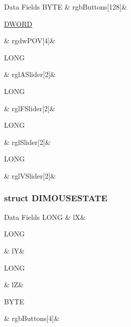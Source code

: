 \begin{DoxyFields}{Data Fields}
\hypertarget{a00003_a67d8ad707a967fceb3d5e7269cde97af}{B\-Y\-T\-E}\label{a00003_a67d8ad707a967fceb3d5e7269cde97af}
&
rgb\-Buttons\mbox{[}128\mbox{]}&
\\
\hline

\hypertarget{a00003_ae49cd858af76a488ea366d4b7b6be542}{\hyperlink{a00003_a50e15ae51c87ae06ab29c8148cb5f36c}{D\-W\-O\-R\-D}}\label{a00003_ae49cd858af76a488ea366d4b7b6be542}
&
rgdw\-P\-O\-V\mbox{[}4\mbox{]}&
\\
\hline

\hypertarget{a00003_a9db4519a25550dc275ab24f42d0b7cfa}{L\-O\-N\-G}\label{a00003_a9db4519a25550dc275ab24f42d0b7cfa}
&
rgl\-A\-Slider\mbox{[}2\mbox{]}&
\\
\hline

\hypertarget{a00003_ad5fb1955f98b4f8fc9b6822431d53637}{L\-O\-N\-G}\label{a00003_ad5fb1955f98b4f8fc9b6822431d53637}
&
rgl\-F\-Slider\mbox{[}2\mbox{]}&
\\
\hline

\hypertarget{a00003_ae16b25838a30c01d12eb11b79ca68018}{L\-O\-N\-G}\label{a00003_ae16b25838a30c01d12eb11b79ca68018}
&
rgl\-Slider\mbox{[}2\mbox{]}&
\\
\hline

\hypertarget{a00003_aa60eefdeb4d2fcd914535ee4766c77e1}{L\-O\-N\-G}\label{a00003_aa60eefdeb4d2fcd914535ee4766c77e1}
&
rgl\-V\-Slider\mbox{[}2\mbox{]}&
\\
\hline

\end{DoxyFields}
\label{da/d82/a00091}
\hypertarget{a00003_da/d82/a00091}{}
\subsubsection{struct D\-I\-M\-O\-U\-S\-E\-S\-T\-A\-T\-E}
\begin{DoxyFields}{Data Fields}
\hypertarget{a00003_a5caab2f62348491c05eb56720be4ed99}{L\-O\-N\-G}\label{a00003_a5caab2f62348491c05eb56720be4ed99}
&
l\-X&
\\
\hline

\hypertarget{a00003_ae174db734839eb185acdb0cd79b9ba24}{L\-O\-N\-G}\label{a00003_ae174db734839eb185acdb0cd79b9ba24}
&
l\-Y&
\\
\hline

\hypertarget{a00003_a7dd7142cab803f67cdcda10d1eb720fd}{L\-O\-N\-G}\label{a00003_a7dd7142cab803f67cdcda10d1eb720fd}
&
l\-Z&
\\
\hline

\hypertarget{a00003_a0b1f5b4611deddd34dd5a086a8801ad9}{B\-Y\-T\-E}\label{a00003_a0b1f5b4611deddd34dd5a086a8801ad9}
&
rgb\-Buttons\mbox{[}4\mbox{]}&
\\
\hline

\end{DoxyFields}
\label{d1/dc1/a00092}
\hypertarget{a00003_d1/dc1/a00092}{}
